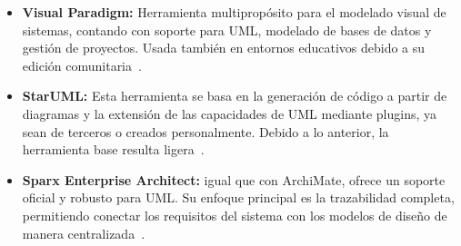 \begin{itemize}
	\item \textbf{Visual Paradigm:} Herramienta multipropósito para el modelado visual de sistemas, contando con soporte para UML, modelado de bases de datos y gestión de proyectos. Usada también en entornos educativos debido a su edición comunitaria~\cite{VisualParadigm01}.
	\item \textbf{StarUML:} Esta herramienta se basa en la generación de código a partir de diagramas y la extensión de las capacidades de UML mediante plugins, ya sean de terceros o creados personalmente. Debido a lo anterior, la herramienta base resulta ligera~\cite{StarUML01}.
	\item \textbf{Sparx Enterprise Architect:} igual que con ArchiMate, ofrece un soporte oficial y robusto para UML. Su enfoque principal es la trazabilidad completa, permitiendo conectar los requisitos del sistema con los modelos de diseño de manera centralizada~\cite{SPARXSITE01}.
\end{itemize}
